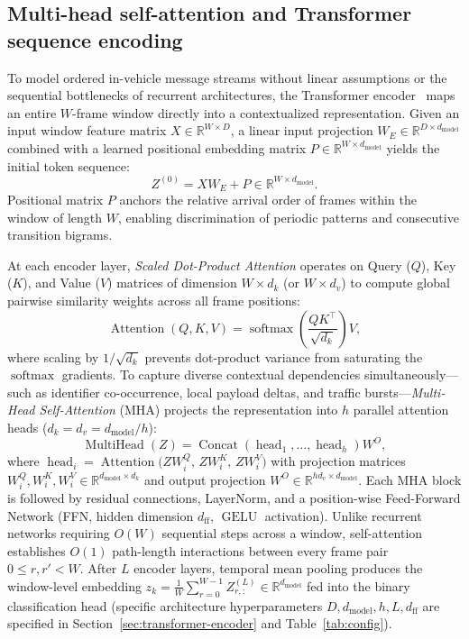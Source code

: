 \documentclass[12pt, a4paper, reqno, oneside]{book}
\begin{document}
\subsection{Multi-head self-attention and Transformer sequence encoding}\label{subsec:self-attention}
To model ordered in-vehicle message streams without linear assumptions or the sequential bottlenecks of recurrent architectures, the Transformer encoder~\cite{vaswani2017attention} maps an entire $W$-frame window directly into a contextualized representation. Given an input window feature matrix $X \in \mathbb{R}^{W \times D}$, a linear input projection $W_E \in \mathbb{R}^{D \times d_{\text{model}}}$ combined with a learned positional embedding matrix $P \in \mathbb{R}^{W \times d_{\text{model}}}$ yields the initial token sequence:
\begin{equation}\label{eq:pos-encoding}
Z^{(0)} = X W_E + P \in \mathbb{R}^{W \times d_{\text{model}}}.
\end{equation}
Positional matrix $P$ anchors the relative arrival order of frames within the window of length $W$, enabling discrimination of periodic patterns and consecutive transition bigrams.

At each encoder layer, \textit{Scaled Dot-Product Attention} operates on Query ($Q$), Key ($K$), and Value ($V$) matrices of dimension $W \times d_k$ (or $W \times d_v$) to compute global pairwise similarity weights across all frame positions:
\begin{equation}\label{eq:scaled-dot-attn}
\operatorname{Attention}(Q, K, V) = \operatorname{softmax}\!\left(\frac{QK^\top}{\sqrt{d_k}}\right)V,
\end{equation}
where scaling by $1/\sqrt{d_k}$ prevents dot-product variance from saturating the $\operatorname{softmax}$ gradients. To capture diverse contextual dependencies simultaneously---such as identifier co-occurrence, local payload deltas, and traffic bursts---\textit{Multi-Head Self-Attention} (MHA) projects the representation into $h$ parallel attention heads ($d_k = d_v = d_{\text{model}}/h$):
\begin{equation}\label{eq:mha}
\operatorname{MultiHead}(Z) = \operatorname{Concat}(\operatorname{head}_1, \ldots, \operatorname{head}_h) W^O,
\end{equation}
where $\operatorname{head}_i = \operatorname{Attention}\!\big(Z W_i^Q,\, Z W_i^K,\, Z W_i^V\big)$ with projection matrices $W_i^Q, W_i^K, W_i^V \in \mathbb{R}^{d_{\text{model}} \times d_k}$ and output projection $W^O \in \mathbb{R}^{h d_v \times d_{\text{model}}}$. Each MHA block is followed by residual connections, LayerNorm, and a position-wise Feed-Forward Network (FFN, hidden dimension $d_{\text{ff}}$, $\operatorname{GELU}$ activation). Unlike recurrent networks requiring $O(W)$ sequential steps across a window, self-attention establishes $O(1)$ path-length interactions between every frame pair $0 \le r, r' < W$. After $L$ encoder layers, temporal mean pooling produces the window-level embedding $z_k = \frac{1}{W}\sum_{r=0}^{W-1} Z^{(L)}_{r,:} \in \mathbb{R}^{d_{\text{model}}}$ fed into the binary classification head (specific architecture hyperparameters $D, d_{\text{model}}, h, L, d_{\text{ff}}$ are specified in Section~\ref{sec:transformer-encoder} and Table~\ref{tab:config}).
\end{document}
